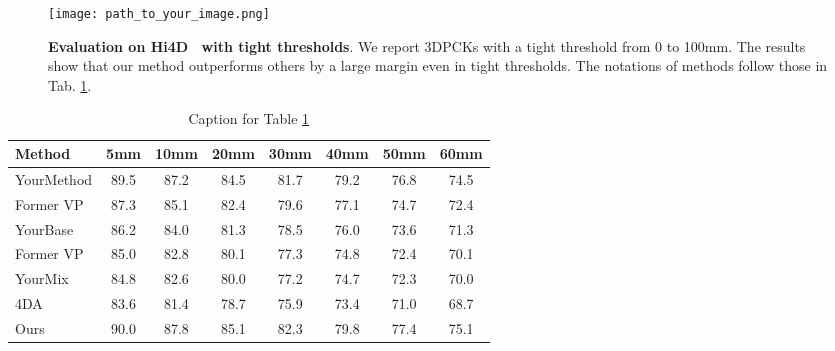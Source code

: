 \begin{figure}[h]
    \centering
    \texttt{[image: path\_to\_your\_image.png]}
    \caption{\textbf{Evaluation on Hi4D~\cite{hi4d} with tight thresholds}. We report 3DPCKs with a tight threshold from 0 to 100mm. The results show that our method outperforms others by a large margin even in tight thresholds. The notations of methods follow those in Tab. \ref{tab:hi4d_eval}.}
    \label{fig:hi4d_tight_thresholds}
\end{figure}

\begin{table}[h]
    \centering
    \caption{Caption for Table \ref{tab:hi4d_eval}}
    \label{tab:hi4d_eval}
    \begin{tabular}{l c c c c c c c}
        \hline
        Method & 5mm & 10mm & 20mm & 30mm & 40mm & 50mm & 60mm \\
        \hline
        YourMethod & 89.5 & 87.2 & 84.5 & 81.7 & 79.2 & 76.8 & 74.5 \\
        Former VP & 87.3 & 85.1 & 82.4 & 79.6 & 77.1 & 74.7 & 72.4 \\
        YourBase & 86.2 & 84.0 & 81.3 & 78.5 & 76.0 & 73.6 & 71.3 \\
        Former VP & 85.0 & 82.8 & 80.1 & 77.3 & 74.8 & 72.4 & 70.1 \\
        YourMix & 84.8 & 82.6 & 80.0 & 77.2 & 74.7 & 72.3 & 70.0 \\
        4DA & 83.6 & 81.4 & 78.7 & 75.9 & 73.4 & 71.0 & 68.7 \\
        Ours & 90.0 & 87.8 & 85.1 & 82.3 & 79.8 & 77.4 & 75.1 \\
        \hline
    \end{tabular}
\end{table}